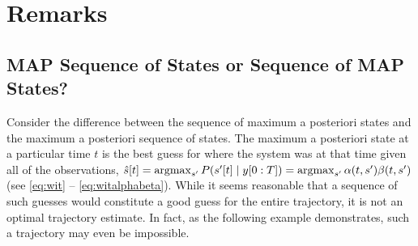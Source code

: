\section{Remarks}
\label{sec:AlgApp}

\subsection{MAP Sequence of States or Sequence of MAP States?}
\label{sec:sequenceMAP}

%

Consider the difference between the sequence of maximum a posteriori states
and the maximum a posteriori sequence of states.  The maximum a posteriori state
at a particular time $t$ is the best guess for where the system was at
that time given all of the observations, \ie
%
${\hat s}{[t]} = \operatorname*{argmax}_{s'}P({s'}{[t]}\mid y[0:T]) =
\operatorname*{argmax}_{s'}\alpha(t,s') \beta(t,s')$
%
(see \eqref{eq:wit} --
\eqref{eq:witalphabeta}).  While it seems reasonable that a sequence
of such guesses would constitute a good guess for the entire
trajectory, it is not an optimal trajectory estimate.  In fact, as the
following example demonstrates, such a trajectory may even be
impossible.

